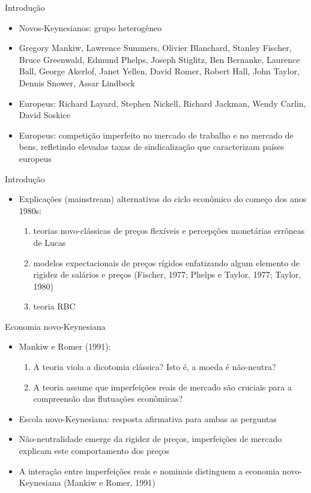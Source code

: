 \documentclass[10pt]{beamer}
\begin{document}
\begin{frame}{Introdução}
    \begin{itemize}
        \item Novos-Keynesianos: grupo heterogêneo\bigskip
        \item Gregory Mankiw, Lawrence Summers, Olivier Blanchard, Stanley Fischer, Bruce Greenwald, Edmund Phelps, Joseph Stiglitz, Ben Bernanke, Laurence Ball, George Akerlof, Janet Yellen, David Romer, Robert Hall, John Taylor, Dennis Snower, Assar Lindbeck\bigskip
        \item Europeus: Richard Layard, Stephen Nickell, Richard Jackman, Wendy Carlin, David Soskice\bigskip
        \item Europeus: competição imperfeito no mercado de trabalho e no mercado de bens, refletindo elevadas taxas de sindicalização que caracterizam países europeus
    \end{itemize}
\end{frame}

\begin{frame}{Introdução}
    \begin{itemize}
        \item Explicações (mainstream) alternativas do ciclo econômico do começo dos anos 1980s:\bigskip
        \begin{enumerate}
            \item teorias novo-clássicas de preços flexíveis e percepções monetárias errôneas de Lucas\bigskip
            \item modelos expectacionais de preços rígidos enfatizando algum elemento de rigidez de salários e preços (Fischer, 1977; Phelps e Taylor, 1977; Taylor, 1980)\bigskip
            \item teoria RBC
        \end{enumerate}
    \end{itemize}
\end{frame}

\begin{frame}{Economia novo-Keynesiana}
    \begin{itemize}
        \item Mankiw e Romer (1991):
        \begin{enumerate}
            \item A teoria viola a dicotomia clássica? Isto é, a moeda é não-neutra?\bigskip
            \item A teoria assume que imperfeições reais de mercado são cruciais para a compreensão das flutuações econômicas?\bigskip
        \end{enumerate}
        \item Escola novo-Keynesiana: resposta afirmativa para ambas as perguntas\bigskip
        \item Não-neutralidade emerge da rigidez de preços, imperfeições de mercado explicam este comportamento dos preços\bigskip
        \item A interação entre imperfeições reais e nominais distinguem a economia novo-Keynesiana (Mankiw e Romer, 1991)
    \end{itemize}    
\end{frame}
\end{document}
